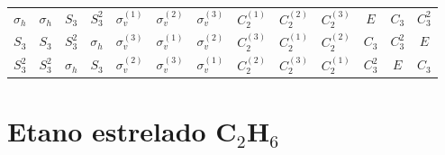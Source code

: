 \documentclass[a4paper,10pt]{article}
\begin{document}
\begin{table}[ht]
\begin{tabular} { |c|c c c c c c c c c c c c | }
$\sigma_h$ & $\sigma_h$ & $S_3$ & $S_3^2$ & $\sigma_v^{(1)}$ & $\sigma_v^{(2)}$ & $\sigma_v^{(3)}$ & $C_2^{(1)}$ & $C_2^{(2)}$ & $C_2^{(3)}$ & $E$ & $C_3$ & $C_3^2$ \\
$S_3$ & $S_3$ & $S_3^2$ & $\sigma_h$ & $\sigma_v^{(3)}$ & $\sigma_v^{(1)}$ & $\sigma_v^{(2)}$ & $C_2^{(3)}$ & $C_2^{(1)}$ & $C_2^{(2)}$ & $C_3$ & $C_3^2$ & $E$ \\
$S_3^2$ & $S_3^2$ & $\sigma_h$ & $S_3$ & $\sigma_v^{(2)}$ & $\sigma_v^{(3)}$ & $\sigma_v^{(1)}$ & $C_2^{(2)}$ & $C_2^{(3)}$ & $C_2^{(1)}$ & $C_3^2$ & $E$ & $C_3$ \\
\hline
\end{tabular}

\label{tab:mult}
\end{table}


\section*{Etano estrelado C$_2$H$_6$}
\end{document}
